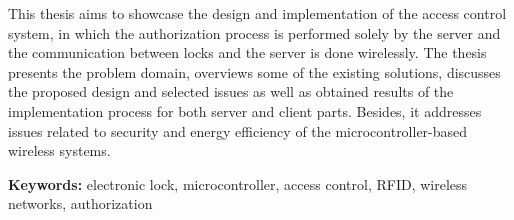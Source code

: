 	This thesis aims to showcase the design and implementation of the access control system, in which the authorization process is performed solely by the server and the communication between locks and the server is done wirelessly. The thesis presents the problem domain, overviews some of the existing solutions, discusses the proposed design and selected issues as well as obtained results of the implementation process for both server and client parts. Besides, it addresses issues related to security and energy efficiency of the microcontroller-based wireless systems.

	\textbf{Keywords:} electronic lock, microcontroller, access control, RFID, wireless networks, authorization